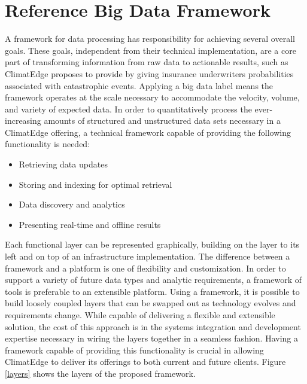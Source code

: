 \section{Reference Big Data Framework}
A framework for data processing has responsibility for achieving several overall goals. These goals, independent from their technical implementation, are a core part of transforming information from raw data to actionable results, such as ClimatEdge proposes to provide by giving insurance underwriters probabilities associated with catastrophic events. Applying a big data label means the framework operates at the scale necessary to accommodate the velocity, volume, and variety of expected data. In order to quantitatively process the ever-increasing amounts of structured and unstructured data sets necessary in a ClimatEdge offering, a technical framework capable of providing the following functionality is needed:
\begin{itemize}
	\item Retrieving data updates
	\item Storing and indexing for optimal retrieval
	\item Data discovery and analytics
	\item Presenting real-time and offline results
\end{itemize}
Each functional layer can be represented graphically, building on the layer to its left and on top of an infrastructure implementation. The difference between a framework and a platform is one of flexibility and customization. In order to support a variety of future data types and analytic requirements, a framework of tools is preferable to an extensible platform. Using a framework, it is possible to build loosely coupled layers that can be swapped out as technology evolves and requirements change. While capable of delivering a flexible and extensible solution, the cost of this approach is in the systems integration and development expertise necessary in wiring the layers together in a seamless fashion. Having a framework capable of providing this functionality is crucial in allowing ClimatEdge to deliver its offerings to both current and future clients. Figure \ref{layers} shows the layers of the proposed framework.

